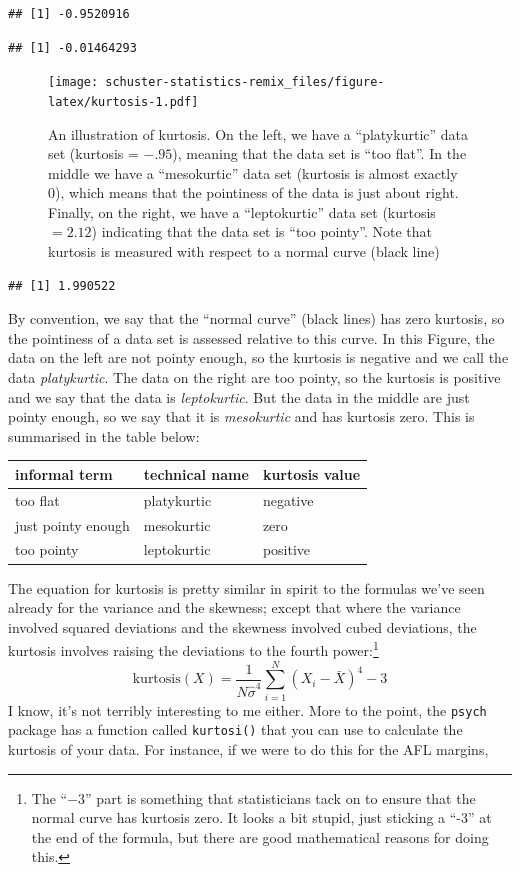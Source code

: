 \documentclass[
]{book}
\begin{document}
\begin{verbatim}
## [1] -0.9520916
\end{verbatim}

\begin{verbatim}
## [1] -0.01464293
\end{verbatim}

\begin{figure}
\centering
\texttt{[image: schuster-statistics-remix\_files/figure-latex/kurtosis-1.pdf]}
\caption{\label{fig:kurtosis}An illustration of kurtosis. On the left, we have a ``platykurtic'' data set (kurtosis = \(-.95\)), meaning that the data set is ``too flat''. In the middle we have a ``mesokurtic'' data set (kurtosis is almost exactly 0), which means that the pointiness of the data is just about right. Finally, on the right, we have a ``leptokurtic'' data set (kurtosis \(= 2.12\)) indicating that the data set is ``too pointy''. Note that kurtosis is measured with respect to a normal curve (black line)}
\end{figure}

\begin{verbatim}
## [1] 1.990522
\end{verbatim}

By convention, we say that the ``normal curve'' (black lines) has zero kurtosis, so the pointiness of a data set is assessed relative to this curve. In this Figure, the data on the left are not pointy enough, so the kurtosis is negative and we call the data \emph{platykurtic}. The data on the right are too pointy, so the kurtosis is positive and we say that the data is \emph{leptokurtic}. But the data in the middle are just pointy enough, so we say that it is \emph{mesokurtic} and has kurtosis zero. This is summarised in the table below:

\begin{tabular}{lll}
\toprule
informal term & technical name & kurtosis value\\
\midrule
too flat & platykurtic & negative\\
just pointy enough & mesokurtic & zero\\
too pointy & leptokurtic & positive\\
\bottomrule
\end{tabular}

The equation for kurtosis is pretty similar in spirit to the formulas we've seen already for the variance and the skewness; except that where the variance involved squared deviations and the skewness involved cubed deviations, the kurtosis involves raising the deviations to the fourth power:\footnote{The ``\(-3\)'' part is something that statisticians tack on to ensure that the normal curve has kurtosis zero. It looks a bit stupid, just sticking a ``-3'' at the end of the formula, but there are good mathematical reasons for doing this.}
\[
\mbox{kurtosis}(X) = \frac{1}{N \hat\sigma^4} \sum_{i=1}^N \left( X_i - \bar{X} \right)^4  - 3
\]
I know, it's not terribly interesting to me either. More to the point, the \texttt{psych} package has a function called \texttt{kurtosi()} that you can use to calculate the kurtosis of your data. For instance, if we were to do this for the AFL margins,
\end{document}

